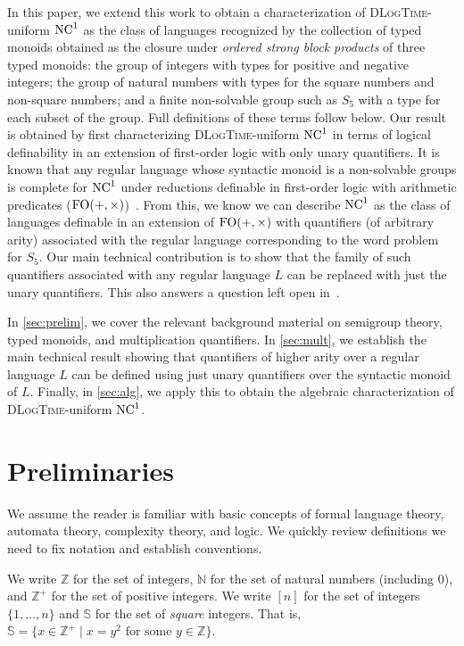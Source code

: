 \documentclass[a4paper,UKenglish,cleveref, autoref, thm-restate, anonymous]{lipics-v2021}
\begin{document}
In this paper, we extend this work to obtain a characterization of \textsc{DLogTime}-uniform $\mathrm{NC}^1$ as the class of languages recognized by the collection of typed monoids obtained as the closure under \emph{ordered strong block products} of three typed monoids: the group of integers with types for positive and negative integers; the group of natural numbers with types for the square numbers and non-square numbers; and a finite non-solvable group such as $S_5$ with a type for each subset of the group.  Full definitions of these terms follow below.  Our result is obtained by first characterizing \textsc{DLogTime}-uniform $\mathrm{NC}^1$ in terms of logical definability in an extension of first-order logic with only unary quantifiers.  It is known that any regular language whose syntactic monoid is a non-solvable groups is complete for $\mathrm{NC}^1$ under reductions definable in first-order logic with arithmetic predicates ($\mathrm{FO}(+,\times)$)~\cite{barrington1990uniformity}.  From this, we know we can describe $\mathrm{NC}^1$ as the class of languages definable in an extension of $\mathrm{FO}(+,\times)$ with quantifiers (of arbitrary arity) associated with the regular language corresponding to the word problem for $S_5$.  Our main technical contribution is to show that the family of such quantifiers associated with any regular language $L$ can be replaced with just the unary quantifiers.  This also answers a question left open in~\cite{lautemann2001descriptive}.

In \autoref{sec:prelim}, we cover the relevant background material on semigroup theory, typed monoids, and multiplication quantifiers.   In \autoref{sec:mult}, we establish the main technical result showing that quantifiers of higher arity over a regular language $L$ can be defined using just unary quantifiers over the syntactic monoid of $L$.  Finally, in \autoref{sec:alg}, we apply this to obtain the algebraic characterization of \textsc{DLogTime}-uniform $\mathrm{NC}^1$.



\section{Preliminaries}\label{sec:prelim}


We assume the reader is familiar with basic concepts of formal language theory, automata theory, complexity theory, and logic.  We quickly review definitions we need to fix notation and establish conventions.

We write $\mathbb{Z}$ for the set of integers, $\mathbb{N}$ for the set of natural numbers (including $0$), and $\mathbb{Z}^+$ for the set of positive integers.
We write $[n]$ for the set of integers $\{1,\ldots,n\}$ and $\mathbb{S}$ for the set of \emph{square} integers.  That is, $\mathbb{S} = \{ x \in \mathbb{Z}^+ \mid x = y^2 \text{ for some } y \in \mathbb{Z}\}$.
\end{document}
